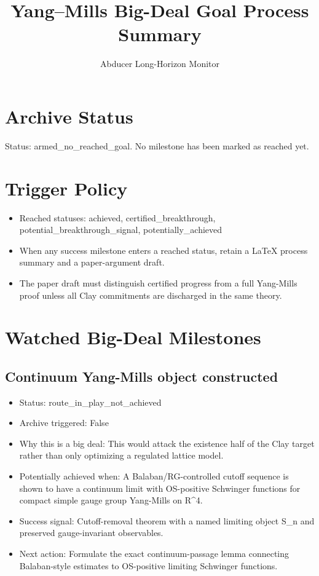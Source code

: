 \documentclass[11pt]{article}
\title{Yang--Mills Big-Deal Goal Process Summary}
\author{Abducer Long-Horizon Monitor}
\date{}
\begin{document}
\maketitle

\section*{Archive Status}

Status: armed\_no\_reached\_goal. No milestone has been marked as reached yet.

\section*{Trigger Policy}

\begin{itemize}
\item Reached statuses: achieved, certified\_breakthrough, potential\_breakthrough\_signal, potentially\_achieved
\item When any success milestone enters a reached status, retain a LaTeX process summary and a paper-argument draft.
\item The paper draft must distinguish certified progress from a full Yang-Mills proof unless all Clay commitments are discharged in the same theory.
\end{itemize}

\section*{Watched Big-Deal Milestones}

\subsection*{Continuum Yang-Mills object constructed}

\begin{itemize}
\item Status: route\_in\_play\_not\_achieved
\item Archive triggered: False
\item Why this is a big deal: This would attack the existence half of the Clay target rather than only optimizing a regulated lattice model.
\item Potentially achieved when: A Balaban/RG-controlled cutoff sequence is shown to have a continuum limit with OS-positive Schwinger functions for compact simple gauge group Yang-Mills on R\textasciicircum{}4.
\item Success signal: Cutoff-removal theorem with a named limiting object S\_n and preserved gauge-invariant observables.
\item Next action: Formulate the exact continuum-passage lemma connecting Balaban-style estimates to OS-positive limiting Schwinger functions.
\end{itemize}
\end{document}
